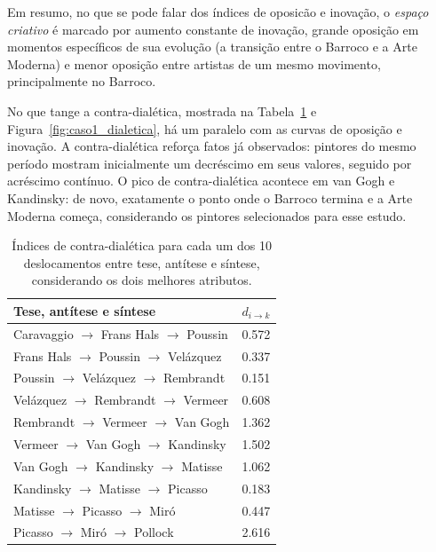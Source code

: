 Em resumo, no que se pode falar dos índices de oposicão e
inovação, o \textit{espaço criativo} é marcado por aumento constante
de inovação, grande oposição em momentos específicos de sua evolução
(a transição entre o Barroco e a Arte Moderna) e menor oposição entre
artistas de um mesmo movimento, principalmente no Barroco.

No que tange a contra-dialética, mostrada na
Tabela~\ref{tab:dialetica1} e Figura~\ref{fig:caso1_dialetica}, há um
paralelo com as curvas de oposição e inovação. A contra-dialética
reforça fatos já observados: pintores do mesmo período mostram
inicialmente um decréscimo em seus valores, seguido por acréscimo
contínuo. O pico de contra-dialética acontece em van Gogh e Kandinsky:
de novo, exatamente o ponto onde o Barroco termina e a Arte Moderna
começa, considerando os pintores selecionados para esse estudo.

\begin{table}[ht]
  \begin{center}
  \caption{\label{tab:dialetica1} Índices de contra-dialética para cada um dos
    10 deslocamentos entre tese, antítese e síntese, considerando os dois
    melhores atributos.}
\begin{tabular}{@{}ll}
  
    \hline \hline
    Tese, antítese e síntese & $d_{i \rightarrow k}$ \\
    \hline
    Caravaggio $\to$ Frans Hals $\to$ Poussin   & 0.572 \\
    Frans Hals $\to$ Poussin $\to$ Vel\'{a}zquez & 0.337 \\
    Poussin $\to$ Vel\'{a}zquez $\to$ Rembrandt  & 0.151 \\
    Vel\'{a}zquez $\to$ Rembrandt $\to$ Vermeer  & 0.608 \\
    Rembrandt $\to$ Vermeer $\to$ Van Gogh      & 1.362 \\
    Vermeer $\to$ Van Gogh $\to$ Kandinsky      & 1.502 \\
    Van Gogh $\to$ Kandinsky $\to$ Matisse      & 1.062 \\
    Kandinsky $\to$ Matisse $\to$ Picasso       & 0.183 \\
    Matisse $\to$ Picasso $\to$ Mir\'{o}         & 0.447 \\
    Picasso $\to$ Mir\'{o} $\to$ Pollock         & 2.616 \\
    \hline \hline
  \end{tabular}
\end{center}
\end{table}


